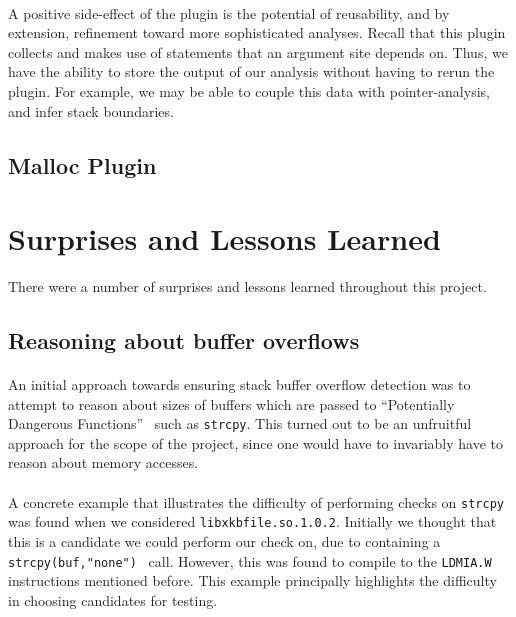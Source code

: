 \documentclass[letterpaper,11pt]{article}
\begin{document}
\paragraph{}
A positive side-effect of the plugin is the potential of reusability, and by
extension, refinement toward more sophisticated analyses. Recall that this
plugin collects and makes use of statements that an argument site depends on.
Thus, we have the ability to store the output of our analysis without having to
rerun the plugin. For example, we may be able to couple this data with
pointer-analysis, and infer stack boundaries.

\subsection{Malloc Plugin}


\section{Surprises and Lessons Learned}
\label{lessonslearned}

There were a number of surprises and lessons learned throughout this project.

\subsection{Reasoning about buffer overflows}

\paragraph{}
An initial approach towards ensuring stack buffer overflow detection was to
attempt to reason about sizes of buffers which are passed to ``Potentially
Dangerous Functions''~\cite{seacord2008cert} such as \texttt{strcpy}. This
turned out to be an unfruitful approach for the scope of the project, since one
would have to invariably have to reason about memory accesses.

\paragraph{}
A concrete example that illustrates the difficulty of performing checks on
\texttt{strcpy} was found when we considered \texttt{libxkbfile.so.1.0.2}.
Initially we thought that this is a candidate we could perform our check on,
due to containing a \texttt{strcpy(buf,"none")}~\cite{xorg} call. However, this was found
to compile to the \texttt{LDMIA.W} instructions mentioned before. This example
principally highlights the difficulty in choosing candidates for testing.
\end{document}
